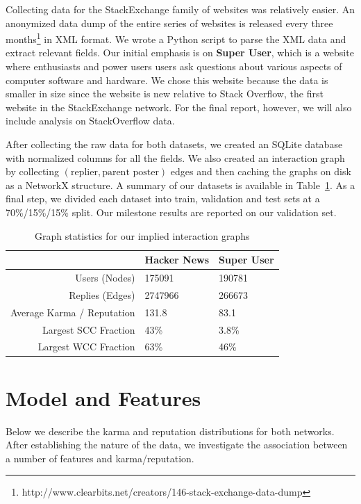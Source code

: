 \documentclass[11pt]{article}
\begin{document}
Collecting data for the StackExchange family of websites was relatively easier.
An anonymized data dump of the entire series of websites is released every three
months\footnote{http://www.clearbits.net/creators/146-stack-exchange-data-dump}
in XML format. We wrote a Python script to parse the XML data and extract
relevant fields. Our initial emphasis is on \textbf{Super User}, which is a website where
enthusiasts and power users users ask questions about various aspects of
computer software and hardware. We chose this website because the data
is smaller in size since the website is new relative to Stack Overflow, the first
website in the StackExchange network. For the final report, however, we will
also include analysis on StackOverflow data.

After collecting the raw data for both datasets, we created an SQLite database
with normalized columns for all the fields. We also created an interaction graph
by collecting $(\text{replier}, \text{parent poster})$ edges and then caching
the graphs on disk as a NetworkX structure. A summary of our datasets is
available in Table~\ref{tab:graphstats}. As a final step, we divided each dataset 
into train, validation and test sets at
a 70\%/15\%/15\% split. Our milestone results are reported on our validation
set.

\begin{table}[t]
\begin{center}
\begin{tabular}{| r | l l |}
\hline
& \textbf{Hacker News} & \textbf{Super User} \\
\hline
Users (Nodes) & 175091 & 190781 \\
Replies (Edges) & 2747966 & 266673 \\
Average Karma / Reputation & 131.8 & 83.1 \\
Largest SCC Fraction & 43\% & 3.8\% \\
Largest WCC Fraction & 63\% & 46\% \\
\hline
\end{tabular}
\end{center}
\caption{Graph statistics for our implied interaction graphs}
\label{tab:graphstats}
\end{table}

\section{Model and Features}
\label{sec:model}
Below we describe the karma and reputation distributions for both networks.
After establishing the nature of the data, we investigate the association 
between a number of features and karma/reputation. 
\end{document}
